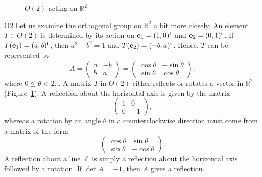  

 
 
\begin{figure}[htb]


\begin{center}
\end{center}

\caption{$O(2)$ acting on ${\mathbb R}^2$}
\label{O2}
\end{figure}
 
 
 
\begin{example}{O2}
Let us examine the orthogonal group  on ${\mathbb R}^2$ a bit more
closely.  An element $T \in O(2)$ is determined by its action on
${\mathbf e}_1 = (1, 0)^{\rm t}$ and ${\mathbf e}_2 = (0, 1)^{\rm t}$. If
$T({\mathbf e}_1) = (a,b)^{\rm t}$, then $a^2 + b^2 = 1$ and $T({\mathbf
e}_2) = (-b, a)^{\rm t}$. Hence, $T$ can be represented by 
\[
A
=
\begin{pmatrix}
a & -b \\
b & a
\end{pmatrix}
=
\begin{pmatrix}
\cos \theta & - \sin \theta \\
\sin \theta & \cos \theta
\end{pmatrix},
\]
where $0 \leq \theta < 2 \pi$. A matrix $T$ in $O(2)$ either reflects
or rotates a vector in ${\mathbb R}^2$ (Figure~\ref{O2}). A reflection about the horizontal axis is
given by the matrix 
\[
\begin{pmatrix}
1 & 0 \\
0 & -1
\end{pmatrix},
\]
whereas a rotation by an angle $\theta$ in a counterclockwise direction
must come from a matrix of the form 
\[
\begin{pmatrix}
\cos \theta & \sin \theta \\
\sin \theta & -\cos \theta
\end{pmatrix}.
\]
A reflection about a line $\ell$ is simply a reflection about the horizontal axis followed by a rotation.  If $\det A =-1$, then $A$ gives a reflection.
\end{example}
 
